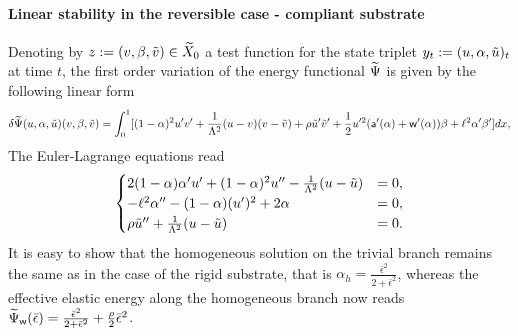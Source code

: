  \paragraph{Linear stability in the reversible case - compliant substrate}



Denoting by $z:=(v, \beta, \tilde v)\in \widetilde{X}_0$ a test function for the state triplet  $y_t:=(u, \alpha, \tilde u)_t$ at time $t$, the first order variation of the energy functional $\widetilde\Psi$ is given by the following linear form 
\begin{equation}
\delta \widetilde\Psi(u, \alpha, \tilde u)(v,\beta,\tilde v)=\int_0^1 [(1-\alpha)^2u'v'+\frac{1}{\Lambda^2} (u- v) (v- \tilde v)+\rho \tilde u'\tilde v'+\frac{1}{2}u'^2 (\mathsf{a}'(\alpha)+\mathsf{w}'(\alpha))\beta+\ell^2\alpha'\beta' ]dx,\label{firstvar}
\end{equation}
The Euler-Lagrange equations read
\begin{eqnarray}
\label{modeld_el_1}
\begin{cases}
  2(1-\alpha)\alpha' u' +(1-\alpha)^2 u'' -  \frac{1}{\Lambda^2}(u-\tilde u) &= 0, \\
  -\ell^2\alpha'' - (1-\alpha)( u')^2 + 2\alpha   &= 0,\\
    \rho  \tilde u''  +  \frac{1}{\Lambda^2}(u-\tilde u) &= 0. \\
\end{cases}
\label{auto2}
\end{eqnarray}
It is easy to show that the homogeneous solution on the trivial branch remains the same as in the case of the rigid substrate, that is $\alpha_h = \frac{\bar{\epsilon}^2}{2 + \bar{\epsilon}^2}\label{eq:homo11}$, whereas the effective elastic energy along the homogeneous branch now reads $\widetilde\Psi_{\mathsf{w}}(\bar{\epsilon}) = \frac{\bar{\epsilon}^2}{2 + \bar{\epsilon}^2} + \frac{\rho}{2}\bar{\epsilon}^2$.

